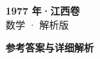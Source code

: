 \documentclass[zihao=-4, a4paper]{ctexart}
\begin{document}
\begin{center}
  {\Large\bfseries 1977 年·江西卷}\\[4pt]
  {\large 数学 · 解析版}
\end{center}
\medskip
{}

\clearpage
{}
\begin{center}{\Large\bfseries 参考答案与详细解析}\end{center}
\medskip

\end{document}
